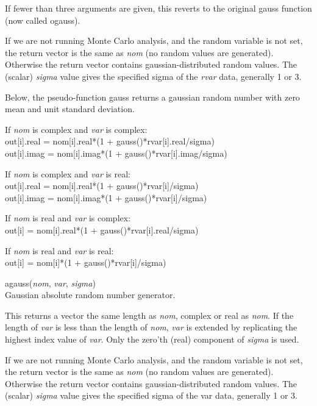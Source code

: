 \begin{description}
If fewer than three arguments are given, this reverts to the original
{\WRspice} {\vt gauss} function (now called {\vt ogauss}).

If we are not running Monte Carlo analysis, and the {\et random}
variable is not set, the return vector is the same as {\it nom} (no
random values are generated).  Otherwise the return vector contains
gaussian-distributed random values.  The (scalar) {\it sigma} value
gives the specified sigma of the {\it rvar} data, generally 1 or 3.

Below, the pseudo-function {\vt gauss} returns a gaussian random
number with zero mean and unit standard deviation.

\begin{description}
\item{If {\it nom} is complex and {\it var} is complex:}\\
  {\vt out[i].real = nom[i].real*(1 + gauss()*rvar[i].real/sigma)}\\
  {\vt out[i].imag = nom[i].imag*(1 + gauss()*rvar[i].imag/sigma)}

\item{If {\it nom} is complex and {\it var} is real:}\\
  {\vt out[i].real = nom[i].real*(1 + gauss()*rvar[i]/sigma)}\\
  {\vt out[i].imag = nom[i].imag*(1 + gauss()*rvar[i]/sigma)}

\item{If {\it nom} is real and {\it var} is complex:}\\
  {\vt out[i] = nom[i].real*(1 + gauss()*rvar[i].real/sigma)}

\item{If {\it nom} is real and {\it var} is real:}\\
  {\vt out[i] = nom[i]*(1 + gauss()*rvar[i]/sigma)}
\end{description}

\item{\vt agauss}({\it nom\/}, {\it var\/},
  {\it sigma\/})\\
Gaussian absolute random number generator.

This returns a vector the same length as {\it nom\/}, complex or real
as {\it nom\/}.  If the length of {\it var} is less than the length of
{\it nom\/}, {\it var} is extended by replicating the highest index
value of {\it var\/}.  Only the zero'th (real) component of {\it
sigma} is used.

If we are not running Monte Carlo analysis, and the {\et random}
variable is not set, the return vector is the same as {\it nom} (no
random values are generated).  Otherwise the return vector contains
gaussian-distributed random values.  The (scalar) {\it sigma} value
gives the specified sigma of the var data, generally 1 or 3.


\end{description}
